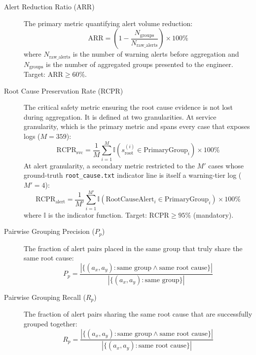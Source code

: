 \begin{description}

\item[Alert Reduction Ratio (ARR)]
The primary metric quantifying alert volume reduction:
\begin{equation}
\text{ARR} = \left(1 - \frac{N_{\text{groups}}}{N_{\text{raw\_alerts}}}\right) \times 100\%
\end{equation}
where $N_{\text{raw\_alerts}}$ is the number of warning alerts before aggregation and $N_{\text{groups}}$ is the number of aggregated groups presented to the engineer. Target: $\text{ARR} \ge 60\%$.

\item[Root Cause Preservation Rate (RCPR)]
The critical safety metric ensuring the root cause evidence is not lost during aggregation. It is defined at two granularities. At service granularity, which is the primary metric and spans every case that exposes logs ($M = 359$):
\begin{equation}
\text{RCPR}_{\text{svc}} = \frac{1}{M} \sum_{i=1}^{M} \mathbb{I}(s_{\text{root}}^{(i)} \in \text{PrimaryGroup}_i) \times 100\%
\end{equation}
At alert granularity, a secondary metric restricted to the $M'$ cases whose ground-truth \texttt{root\_cause.txt} indicator line is itself a warning-tier log ($M' = 4$):
\begin{equation}
\text{RCPR}_{\text{alert}} = \frac{1}{M'} \sum_{i=1}^{M'} \mathbb{I}(\text{RootCauseAlert}_i \in \text{PrimaryGroup}_i) \times 100\%
\end{equation}
where $\mathbb{I}$ is the indicator function. Target: $\text{RCPR} \ge 95\%$ (mandatory).

\item[Pairwise Grouping Precision ($P_p$)]
The fraction of alert pairs placed in the same group that truly share the same root cause:
\begin{equation}
P_p = \frac{|\{(a_x, a_y) : \text{same group} \land \text{same root cause}\}|}{|\{(a_x, a_y) : \text{same group}\}|}
\end{equation}

\item[Pairwise Grouping Recall ($R_p$)]
The fraction of alert pairs sharing the same root cause that are successfully grouped together:
\begin{equation}
R_p = \frac{|\{(a_x, a_y) : \text{same group} \land \text{same root cause}\}|}{|\{(a_x, a_y) : \text{same root cause}\}|}
\end{equation}


\end{description}
